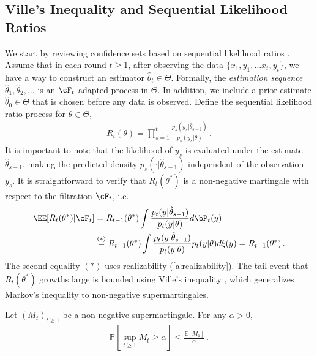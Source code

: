 \subsection{Ville's Inequality and Sequential Likelihood Ratios}

We start by reviewing confidence sets based on sequential likelihood ratios \citep{robbins1970statistical,lai1985asymptotically}. Assume that in each round $t \geq 1$, after observing the data $\{x_1, y_1, \dots x_t, y_t\}$, we have a way to construct an estimator $\hat \theta_t \in \Theta$. Formally, the \emph{estimation sequence} $\hat \theta_1, \hat \theta_2, \dots$ is an $\cF_t$-adapted process in $\Theta$. In addition, we include a prior estimate $\hat \theta_0 \in \Theta$ that is chosen before any data is observed. Define the sequential likelihood ratio process for $\theta \in \Theta$,
\begin{align}
    R_t(\theta) = \prod_{s=1}^t \frac{p_s(y_s|\hat \theta_{s-1})}{p_s(y_s|\theta)} \,.
\end{align}
It is important to note that the likelihood of $y_s$ is evaluated under the estimate $\hat \theta_{s-1}$, making the predicted density $p_s(\cdot|\hat \theta_{s-1})$ independent of the observation $y_s$. It is straightforward to verify that $R_t(\theta^*)$ is a non-negative martingale with respect to the filtration $\cF_t$, i.e. 
\begin{align}
    \EE[R_t(\theta^*)|\cF_{t}] &= R_{t-1}(\theta^*) \int \frac{p_t(y|\hat \theta_{s-1})}{p_t(y|\theta)} d\bP_t(y)\nonumber \\
    & \stackrel{(*)}{=} R_{t-1}(\theta^*) \int \frac{p_t(y|\hat \theta_{s-1})}{p_t(y|\theta)} p_t(y|\theta) d\xi(y)  = R_{t-1}(\theta^*) \,.
\end{align}
The second equality $(*)$ uses realizability (\cref{a:realizability}).
The tail event that $R_t(\theta^*)$ growths large is bounded using Ville's inequality \citep{ville1939etude}, which generalizes Markov's inequality to non-negative supermartingales.
\begin{lemma}
    Let \((M_t)_{t \geq 1}\) be a non-negative supermartingale. For any \(\alpha > 0\),
    \begin{align}
        \mathbb{P}\left[\sup_{t \geq 1} M_t \geq \alpha \right] \leq \frac{\mathbb{E}[M_1]}{\alpha} \,.
    \end{align}
\end{lemma}
